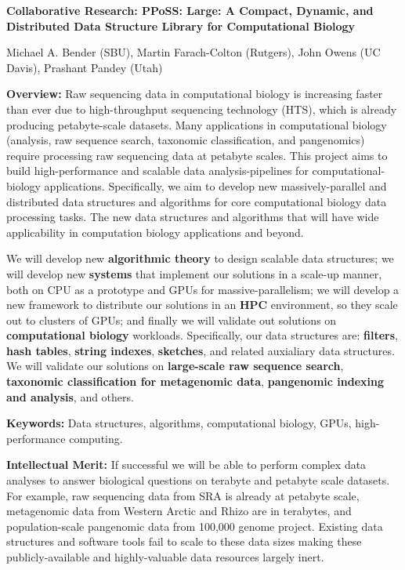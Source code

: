 
\begin{center}
\bf
\Large
Collaborative Research: PPoSS\@: Large: A Compact, Dynamic, and Distributed Data
Structure Library for Computational Biology

\medskip
\small
Michael A. Bender (SBU), Martin Farach-Colton (Rutgers), John Owens (UC Davis),
Prashant Pandey (Utah)
\end{center}


\noindent \textbf{\large Overview:}
Raw sequencing data in computational biology is increasing faster than ever due to high-throughput sequencing technology (HTS), which is already producing petabyte-scale datasets. Many applications in computational biology (\kmer analysis, raw sequence search, taxonomic classification, and pangenomics) require processing raw sequencing data at petabyte scales. This project aims to build high-performance and scalable data analysis-pipelines for computational-biology applications. Specifically, we aim to develop new massively-parallel and distributed data structures and algorithms for core computational biology data processing tasks. The new data structures and algorithms that will have wide applicability in computation biology applications and beyond.

We will develop new \textbf{algorithmic theory} to design scalable data structures; we will develop new \textbf{systems} that implement our solutions in a scale-up manner,  both on CPU as a prototype and GPUs for massive-parallelism; we will develop a new framework to distribute our solutions in an \textbf{HPC} environment, so they  scale out to clusters of GPUs; and finally we will validate out solutions on \textbf{computational biology} workloads.
%
Specifically, our data structures are: \textbf{filters}, \textbf{hash tables}, \textbf{string indexes}, \textbf{sketches}, and related auxialiary data structures.  We will validate our solutions on \textbf{large-scale raw sequence search}, \textbf{taxonomic classification for metagenomic data}, \textbf{pangenomic indexing and analysis}, and others.


\noindent \textbf{\large Keywords:} Data structures, algorithms, computational biology, GPUs, high-performance computing.

\noindent \textbf{\large Intellectual Merit:}
If successful we will be able to perform complex data analyses to answer biological questions on terabyte and petabyte scale datasets. For example, raw sequencing data from SRA is already at petabyte scale, metagenomic data from Western Arctic and Rhizo are in terabytes, and population-scale pangenomic data from 100,000 genome project. Existing data structures and software tools fail to scale to these data sizes making these publicly-available and highly-valuable data resources largely inert.

